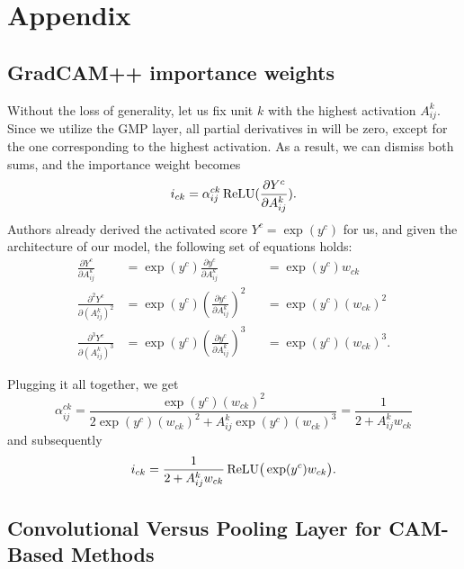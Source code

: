 \renewcommand{\thechapter}{A}
\chapter{Appendix}

\section*{GradCAM++ importance weights}\label{sec:grad-cam-plus-plus-weight-derivation}

Without the loss of generality, let us fix unit $k$ with the highest activation $A^k_{ij}$.
Since we utilize the GMP layer, all partial derivatives in  will be zero, except for the one corresponding to the highest activation.
As a result, we can dismiss both sums, and the importance weight becomes 
\begin{equation}
    i_{ck} = \alpha^{ck}_{ij} \operatorname{ReLU}(\frac{\partial Y^c}{\partial A^k_{ij}}).
\end{equation}
Authors already derived the activated score $Y^c = \exp(y^c)$ for us, and given the architecture of our model, the following set of equations holds:
\begin{equation}
\begin{aligned}
  \frac{\partial Y^c}{\partial A_{ij}^k}       &= \exp(y^c) \frac{\partial y^c}{\partial A_{ij}^k}     &&= \exp(y^c) w_{ck}     \\
  \frac{\partial^2 Y^c}{\partial (A_{ij}^k)^2} &= \exp(y^c) (\frac{\partial y^c}{\partial A_{ij}^k})^2 &&= \exp(y^c) (w_{ck})^2 \\
  \frac{\partial^3 Y^c}{\partial (A_{ij}^k)^3} &= \exp(y^c) (\frac{\partial y^c}{\partial A_{ij}^k})^3 &&= \exp(y^c) (w_{ck})^3.
\end{aligned}
\end{equation}

Plugging it all together, we get 
\begin{equation}
    \alpha_{ij}^{ck} = \frac{\exp(y^c) (w_{ck})^2}{2 \exp(y^c) (w_{ck})^2 + A^k_{ij} \exp(y^c) (w_{ck})^3} = \frac{1}{2 + A^k_{ij}w_{ck}}
\end{equation}
and subsequently
\begin{equation}
    i_{ck} = \frac{1}{2 + A^k_{ij}w_{ck}} \operatorname{ReLU}\bigr(\exp(y^c)w_{ck}\bigl).
\end{equation}

\section*{Convolutional Versus Pooling Layer for CAM-Based Methods}\label{sec:conv-vs-pool}

